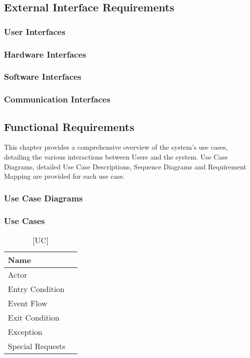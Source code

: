 \subsection{External Interface Requirements}
\subsubsection{User Interfaces}
\subsubsection{Hardware Interfaces}
\subsubsection{Software Interfaces}
\subsubsection{Communication Interfaces}
\subsection{Functional Requirements}
This chapter provides a comprehensive overview of the system's use cases, detailing the various interactions between Users and the system.
Use Case Diagrams, detailed Use Case Descriptions, Sequence Diagrams and Requirement Mapping are provided for each use case.
\subsubsection{Use Case Diagrams}
\subsubsection{Use Cases}
\begin{table}[H]
    \centering
    \begin{tabular}{|l|l|}
    \hline
    Name & \\ \hline
    Actor & \\ \hline
    Entry Condition & \\ \hline
    Event Flow & \\ \hline
    Exit Condition & \\ \hline
    Exception & \\ \hline
    Special Requests & \\ \hline
    \end{tabular}
    \caption{[UC]}
    \label{tab:UC}
\end{table}
